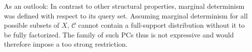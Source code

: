 \documentclass[9pt,fleqn,twoside,twocolumn]{stdglobal}
\begin{document}
  As an outlook: In contrast to other structural properties, marginal determinism was defined with respect to its query set.
  Assuming marginal determinism for all possible subsets of $X$, $\mathscr{C}$ cannot contain a full-support distribution without it to be fully factorized.
  The family of such PCs thus is not expressive and would therefore impose a too strong restriction.

\nocite{*}
\AtNextBibliography{\footnotesize}
\printbibliography[heading=bibintoc]
\end{document}
